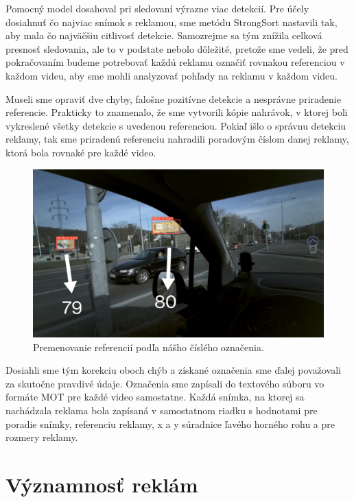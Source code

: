 Pomocný model dosahoval pri sledovaní výrazne viac detekcií. Pre účely dosiahnuť čo najviac snímok s reklamou, sme metódu StrongSort nastavili tak, aby mala čo najväčšiu citlivosť detekcie. Samozrejme sa tým znížila celková presnosť sledovania, ale to v podstate nebolo dôležité, pretože sme vedeli, že pred pokračovaním budeme potrebovať každú reklamu označiť rovnakou referenciou v každom videu, aby sme mohli analyzovať pohľady na reklamu v každom videu.

Museli sme opraviť dve chyby, falošne pozitívne detekcie a nesprávne priradenie referencie. Prakticky to znamenalo, že sme vytvorili kópie nahrávok, v ktorej boli vykreslené všetky detekcie s uvedenou referenciou. Pokiaľ išlo o správnu detekciu reklamy, tak sme priradenú referenciu nahradili poradovým číslom danej reklamy, ktorá bola rovnaké pre každé video.

\begin{figure}[ht]
     \centering
     \includegraphics[width=1\textwidth]{images/04/mapping.jpg}
     \caption{Premenovanie referencií podľa nášho číslého označenia.}
     \label{img:mapping}
 \end{figure}

Dosiahli sme tým korekciu oboch chýb a získané označenia sme ďalej považovali za skutočne pravdivé údaje. Označenia sme zapísali do textového súboru vo formáte MOT pre každé video samostatne. Každá snímka, na ktorej sa nachádzala reklama bola zapísaná v samostatnom riadku s hodnotami pre poradie snímky, referenciu reklamy, x a y súradnice ľavého horného rohu a pre rozmery reklamy.

\section{Významnosť reklám}

